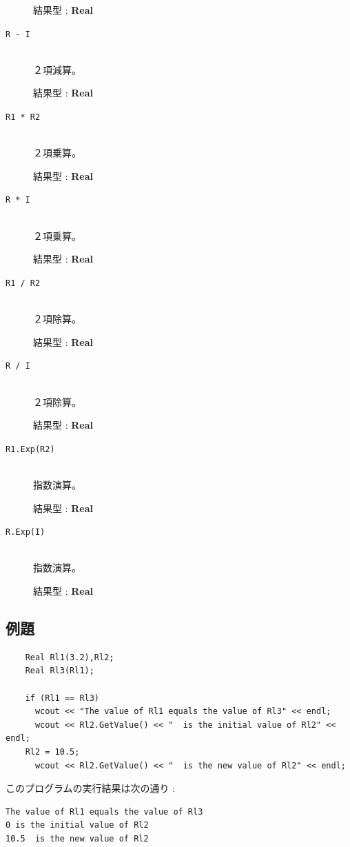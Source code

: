 \documentclass[\pformat,12pt]{jarticle}
\begin{document}
\begin{description}
     結果型 : {\bf Real}

\item[{\tt R - I}] \mbox{}\\
     ２項減算。 

     結果型 : {\bf Real}

\item[{\tt R1 * R2}] \mbox{}\\
     ２項乗算。 

     結果型 : {\bf Real}

\item[{\tt R * I}] \mbox{}\\
     ２項乗算。 

     結果型 : {\bf Real}

\item[{\tt R1 / R2}] \mbox{}\\
     ２項除算。 

     結果型 : {\bf Real}

\item[{\tt R / I}] \mbox{}\\
     ２項除算。 

     結果型 : {\bf Real}

\item[{\tt R1.Exp(R2)}] \mbox{}\\
     指数演算。 

     結果型 : {\bf Real}

\item[{\tt R.Exp(I)}] \mbox{}\\
     指数演算。 

     結果型 : {\bf Real}
\end{description}

\subsection*{例題}

\begin{verbatim}
    Real Rl1(3.2),Rl2;
    Real Rl3(Rl1);

    if (Rl1 == Rl3)
      wcout << "The value of Rl1 equals the value of Rl3" << endl;
      wcout << Rl2.GetValue() << "  is the initial value of Rl2" << endl;
    Rl2 = 10.5;
      wcout << Rl2.GetValue() << "  is the new value of Rl2" << endl;
\end{verbatim}

\noindent このプログラムの実行結果は次の通り :

\begin{verbatim}
The value of Rl1 equals the value of Rl3
0 is the initial value of Rl2
10.5  is the new value of Rl2
\end{verbatim}
\end{document}
